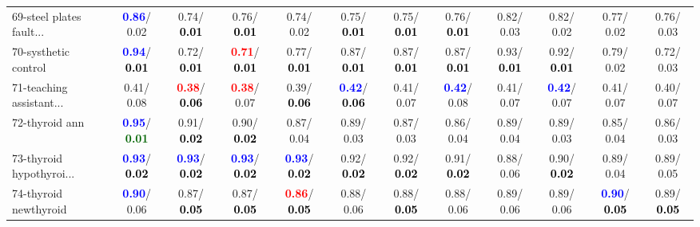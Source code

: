 \begin{table}[h]
\begin{center}
{\begin{tabular}{lc|c|c|c|c|c|c|c|c|c|c}
69-steel plates fault... & \textcolor{blue}{\textbf{  0.86}}/  0.02 &   0.74/\textcolor{black}{\textbf{  0.01}} &   0.76/\textcolor{black}{\textbf{  0.01}} &   0.74/  0.02 &   0.75/\textcolor{black}{\textbf{  0.01}} &   0.75/\textcolor{black}{\textbf{  0.01}} &   0.76/\textcolor{black}{\textbf{  0.01}} &   0.82/  0.03 &   0.82/  0.02 &   0.77/  0.02 &   0.76/  0.03 \\
70-systhetic control & \textcolor{blue}{\textbf{  0.94}}/\textcolor{black}{\textbf{  0.01}} &   0.72/\textcolor{black}{\textbf{  0.01}} & \textcolor{red}{\textbf{  0.71}}/\textcolor{black}{\textbf{  0.01}} &   0.77/\textcolor{black}{\textbf{  0.01}} &   0.87/\textcolor{black}{\textbf{  0.01}} &   0.87/\textcolor{black}{\textbf{  0.01}} &   0.87/\textcolor{black}{\textbf{  0.01}} &   0.93/\textcolor{black}{\textbf{  0.01}} &   0.92/\textcolor{black}{\textbf{  0.01}} &   0.79/  0.02 &   0.72/  0.03 \\
71-teaching assistant... &   0.41/  0.08 & \textcolor{red}{\textbf{  0.38}}/\textcolor{black}{\textbf{  0.06}} & \textcolor{red}{\textbf{  0.38}}/  0.07 &   0.39/\textcolor{black}{\textbf{  0.06}} & \textcolor{blue}{\textbf{  0.42}}/\textcolor{black}{\textbf{  0.06}} &   0.41/  0.07 & \textcolor{blue}{\textbf{  0.42}}/  0.08 &   0.41/  0.07 & \textcolor{blue}{\textbf{  0.42}}/  0.07 &   0.41/  0.07 &   0.40/  0.07 \\ \hline
72-thyroid ann & \textcolor{blue}{\textbf{  0.95}}/\textcolor{darkgreen}{\textbf{  0.01}} &   0.91/\textcolor{black}{\textbf{  0.02}} &   0.90/\textcolor{black}{\textbf{  0.02}} &   0.87/  0.04 &   0.89/  0.03 &   0.87/  0.03 &   0.86/  0.04 &   0.89/  0.04 &   0.89/  0.03 &   0.85/  0.04 &   0.86/  0.03 \\
73-thyroid hypothyroi... & \textcolor{blue}{\textbf{  0.93}}/\textcolor{black}{\textbf{  0.02}} & \textcolor{blue}{\textbf{  0.93}}/\textcolor{black}{\textbf{  0.02}} & \textcolor{blue}{\textbf{  0.93}}/\textcolor{black}{\textbf{  0.02}} & \textcolor{blue}{\textbf{  0.93}}/\textcolor{black}{\textbf{  0.02}} &   0.92/\textcolor{black}{\textbf{  0.02}} &   0.92/\textcolor{black}{\textbf{  0.02}} &   0.91/\textcolor{black}{\textbf{  0.02}} &   0.88/  0.06 &   0.90/\textcolor{black}{\textbf{  0.02}} &   0.89/  0.04 &   0.89/  0.05 \\
74-thyroid newthyroid & \textcolor{blue}{\textbf{  0.90}}/  0.06 &   0.87/\textcolor{black}{\textbf{  0.05}} &   0.87/\textcolor{black}{\textbf{  0.05}} & \textcolor{red}{\textbf{  0.86}}/\textcolor{black}{\textbf{  0.05}} &   0.88/  0.06 &   0.88/\textcolor{black}{\textbf{  0.05}} &   0.88/  0.06 &   0.89/  0.06 &   0.89/  0.06 & \textcolor{blue}{\textbf{  0.90}}/\textcolor{black}{\textbf{  0.05}} &   0.89/\textcolor{black}{\textbf{  0.05}} \\

\end{tabular}}
\end{center}
\end{table}
